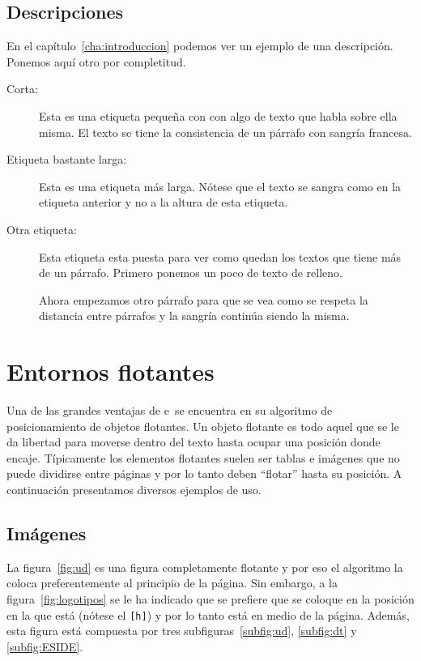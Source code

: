 \documentclass{DeustoFDP}
\begin{document}
\subsection{Descripciones}

En el cap\'itulo~\ref{cha:introduccion} podemos ver un ejemplo de una
descripci\'on. Ponemos aqu\'i otro por completitud.
\begin{description}
  \item[Corta:] Esta es una etiqueta peque\~na con con algo de texto que habla
    sobre ella misma. El texto se tiene la consistencia de un p\'arrafo con
    sangr\'ia francesa.
  \item[Etiqueta bastante larga:] Esta es una etiqueta m\'as larga. N\'otese
    que el texto se sangra como en la etiqueta anterior y no a la altura
    de esta etiqueta.
  \item[Otra etiqueta:] Esta etiqueta esta puesta para ver como quedan los
    textos que tiene m\'as de un p\'arrafo. Primero ponemos un poco de texto
    de relleno.

    Ahora empezamos otro p\'arrafo para que se vea como se respeta la distancia
    entre p\'arrafos y la sangr\'ia contin\'ua siendo la misma.
\end{description}

\section{Entornos flotantes}

Una de las grandes ventajas de e\ se encuentra en su algoritmo de
posicionamiento de objetos flotantes. Un objeto flotante es todo aquel que se
le da libertad para moverse dentro del texto hasta ocupar una posici\'on donde
encaje. T\'ipicamente los elementos flotantes suelen ser tablas e im\'agenes
que no puede dividirse entre p\'aginas y por lo tanto deben \enquote{flotar}
hasta su posici\'on. A continuaci\'on presentamos diversos ejemplos de uso.

\subsection{Im\'agenes}

La figura~\ref{fig:ud} es una figura completamente flotante y por eso el
algoritmo la coloca preferentemente al principio de la p\'agina. Sin embargo,
a la figura~\ref{fig:logotipos} se le ha indicado que se prefiere que se coloque
en la posici\'on en la que est\'a (n\'otese el \texttt{[h]}) y por lo tanto
est\'a en medio de la p\'agina. Adem\'as, esta figura est\'a compuesta
por tres subfiguras~\ref{subfig:ud}, \ref{subfig:dt} y \ref{subfig:ESIDE}.
\end{document}
